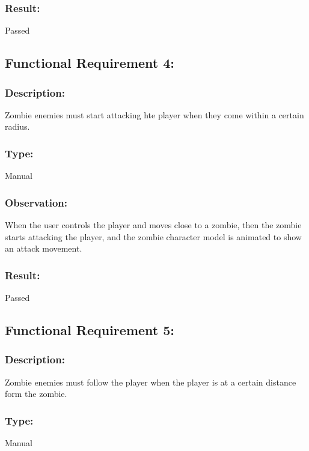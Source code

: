 \documentclass[12pt, titlepage]{article}
\begin{document}
\subsubsection[Pass / Fail:] {Result: } Passed


\subsection{Functional Requirement 4: } 

\subsubsection{Description: }Zombie enemies must start attacking hte player when they come within a certain radius.

\subsubsection{Type: } Manual

\subsubsection{Observation: } When the user controls the player and moves close to a zombie, then the zombie starts attacking the player, and the zombie character model is animated to show an attack movement.

\subsubsection[Pass / Fail:] {Result: } Passed


\subsection{Functional Requirement 5: } 

\subsubsection{Description: }Zombie enemies must follow the player when the player is at a certain distance form the zombie.

\subsubsection{Type: } Manual
\end{document}
